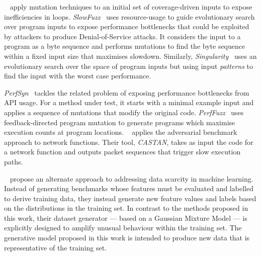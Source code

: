 \citeauthor{Dhok2016}~\cite{Dhok2016} apply mutation techniques to an initial set of coverage-driven inputs to expose inefficiencies in loops.
\emph{SlowFuzz}~\cite{Petsios2017} uses resource-usage to guide evolutionary search over program inputs to expose performance bottlenecks that could be exploited by attackers to produce Denial-of-Service attacks. It considers the input to a program as a byte sequence and performs mutations to find the byte sequence within a fixed input size that maximises slowdown.
Similarly, \emph{Singularity}~\cite{Wei2018} uses an evolutionary search over the space of program inputs but using input \emph{patterns} to find the input with the worst case performance.

\emph{PerfSyn}~\cite{Toffola2018} tackles the related problem of exposing performance bottlenecks from API usage. For a method under test, it starts with a minimal example input and applies a sequence of mutations that modify the original code.
\emph{PerfFuzz}~\cite{Lemieux2018} uses feedback-directed program mutation to generate programs which maximise execution counts at program locations.
\citeauthor{Pedrosa2018}~\cite{Pedrosa2018} applies the adversarial benchmark approach to network functions. Their tool, \emph{CASTAN}, takes as input the code for a network function and outputs packet sequences that trigger slow execution paths.

\citeauthor{Ding2019}~\cite{Ding2019} propose an alternate approach to addressing data scarcity in machine learning. Instead of generating benchmarks whose features must be evaluated and labelled to derive training data, they instead generate new feature values and labels based on the distributions in the training set. In contrast to the methods proposed in this work, their dataset generator --- based on a Gaussian Mixture Model --- is explicitly designed to amplify unusual behaviour within the training set. The generative model proposed in this work is intended to produce new data that is representative of the training set.

